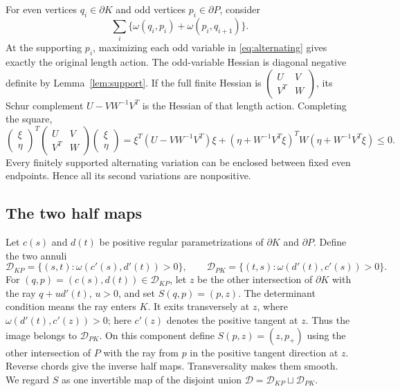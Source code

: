 \documentclass[11pt]{amsart}
\theoremstyle{remark}
\begin{document}
For even vertices $q_i\in\partial K$ and odd vertices $p_i\in\partial P$,
consider
\begin{equation}\label{eq:alternating}
\sum_i\{\omega(q_i,p_i)+\omega(p_i,q_{i+1})\}.
\end{equation}
At the supporting $p_i$, maximizing each odd variable in
\eqref{eq:alternating} gives exactly the original length action.
The odd-variable Hessian is diagonal negative definite by
Lemma~\ref{lem:support}. If the full finite Hessian is
$\begin{pmatrix}U&V\\V^T&W\end{pmatrix}$, its Schur complement
$U-VW^{-1}V^T$ is the Hessian of that length action. Completing the square,
\[
\begin{pmatrix}\xi\\\eta\end{pmatrix}^{\!T}
\begin{pmatrix}U&V\\V^T&W\end{pmatrix}
\begin{pmatrix}\xi\\\eta\end{pmatrix}
=\xi^T(U-VW^{-1}V^T)\xi
+(\eta+W^{-1}V^T\xi)^TW(\eta+W^{-1}V^T\xi)\leq0.
\]
Every finitely supported alternating variation can be enclosed between
fixed even endpoints. Hence all its second variations are nonpositive.

\subsection{The two half maps}

Let $c(s)$ and $d(t)$ be positive regular parametrizations of
$\partial K$ and $\partial P$. Define the two annuli
\[
\mathcal D_{KP}=\{(s,t):\omega(c'(s),d'(t))>0\},\qquad
\mathcal D_{PK}=\{(t,s):\omega(d'(t),c'(s))>0\}.
\]
For $(q,p)=(c(s),d(t))\in\mathcal D_{KP}$, let $z$ be the other
intersection of $\partial K$ with the ray $q+u d'(t)$, $u>0$, and set
$S(q,p)=(p,z)$. The determinant condition means the ray enters $K$.
It exits transversely at $z$, where
$\omega(d'(t),c'(z))>0$; here $c'(z)$ denotes the positive tangent at $z$.
Thus the image belongs to $\mathcal D_{PK}$.
On this component define $S(p,z)=(z,p_+)$ using the other intersection
of $P$ with the ray from $p$ in the positive tangent direction at $z$.
Reverse chords give the inverse half maps. Transversality makes them smooth.
We regard $S$ as one invertible map of the disjoint union
$\mathcal D=\mathcal D_{KP}\sqcup\mathcal D_{PK}$.
\end{document}

